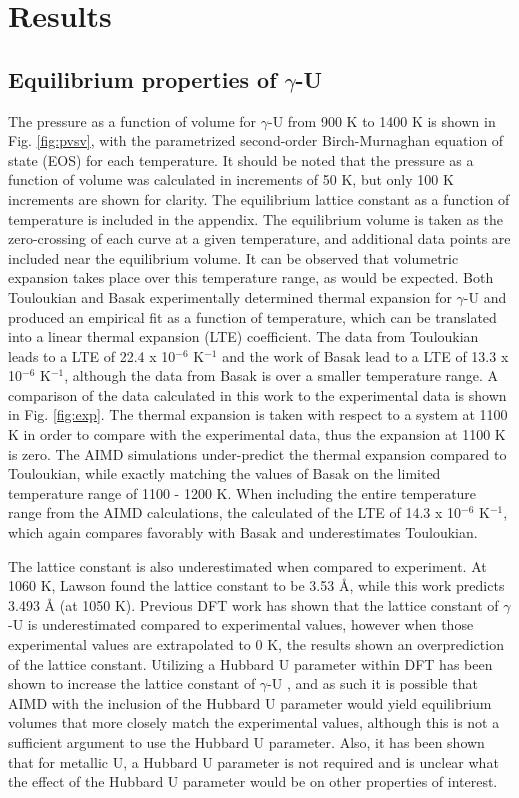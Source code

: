 \documentclass[review]{elsarticle}
\begin{document}
\section{Results}
\subsection{Equilibrium properties of $\gamma$-U}

The pressure as a function of volume for $\gamma$-U from 900 K to 1400 K is shown in Fig. \ref{fig:pvsv}, with the parametrized second-order Birch-Murnaghan equation of state (EOS) for each temperature. It should be noted that the pressure as a function of volume was calculated in increments of 50 K, but only 100 K increments are shown for clarity. The equilibrium lattice constant as a function of temperature is included in the appendix. The equilibrium volume is taken as the zero-crossing of each curve at a given temperature, and additional data points are included near the equilibrium volume. It can be observed that volumetric expansion takes place over this temperature range, as would be expected. Both Touloukian \cite{touloukian} and Basak \cite{basak} experimentally determined thermal expansion for $\gamma$-U and produced an empirical fit as a function of temperature, which can be translated into a linear thermal expansion (LTE) coefficient. The data from Touloukian leads to a LTE of 22.4 x 10$^{-6}$ K$^{-1}$ and the work of Basak lead to a LTE of 13.3 x 10$^{-6}$ K$^{-1}$, although the data from Basak is over a smaller temperature range. A comparison of the data calculated in this work to the experimental data is shown in Fig. \ref{fig:exp}. The thermal expansion is taken with respect to a system at 1100 K in order to compare with the experimental data, thus the expansion at 1100 K is zero. The AIMD simulations under-predict the thermal expansion compared to Touloukian, while exactly matching the values of Basak on the limited temperature range of 1100 - 1200 K. When including the entire temperature range from the AIMD calculations, the calculated of the LTE of 14.3 x 10$^{-6}$ K$^{-1}$, which again compares favorably with Basak and underestimates Touloukian.

The lattice constant is also underestimated when compared to experiment. At 1060 K, Lawson \cite{lawson1988} found the lattice constant to be 3.53 {\AA}, while this work predicts 3.493 {\AA} (at 1050 K). Previous DFT work has shown that the lattice constant of $\gamma$-U is underestimated compared to experimental values, however when those experimental values are extrapolated to 0 K, the results shown an overprediction of the lattice constant\cite{beeler2010, xie2013}. Utilizing a Hubbard U parameter within DFT has been shown to increase the lattice constant of $\gamma$-U \cite{xie2013}, and as such it is possible that AIMD with the inclusion of the Hubbard U parameter would yield equilibrium volumes that more closely match the experimental values, although this is not a sufficient argument to use the Hubbard U parameter. Also, it has been shown that for metallic U, a Hubbard U parameter is not required \cite{wirth2012, wirth2011, beeler2010, taylor2008, beeler2013} and is unclear what the effect of the Hubbard U parameter would be on other properties of interest. 
\end{document}
